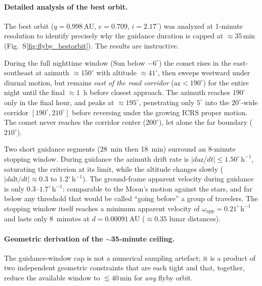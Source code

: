 \documentclass[11pt,a4paper]{article}
\begin{document}
\paragraph{Detailed analysis of the best orbit.}
The best orbit ($q=0.998$\,AU, $e=0.709$, $i=2.17^\circ$) was analyzed at
1-minute resolution to identify precisely why the guidance duration is capped
at $\approx\!35$\,min (Fig.~S\ref{fig:flyby_bestorbit}). The results are
instructive.

During the full nighttime window (Sun below $-6^\circ$) the comet rises in the
east-southeast at azimuth $\approx\!150^\circ$ with altitude $\approx\!41^\circ$,
then sweeps westward under diurnal motion, but remains \emph{east of the road
corridor} ($\mathrm{az} < 190^\circ$) for the entire night until the final
$\approx\!1$~h before closest approach. The azimuth reaches $190^\circ$ only
in the final hour, and peaks at $\approx\!195^\circ$, penetrating only
$5^\circ$ into the $20^\circ$-wide corridor $[190^\circ, 210^\circ]$ before
reversing under the growing ICRS proper motion. The comet never reaches the
corridor center ($200^\circ$), let alone the far boundary ($210^\circ$).

Two short guidance segments (28~min then 18~min) surround an 8-minute stopping
window. During guidance the azimuth drift rate is $|d\mathrm{az}/dt| \leq
1.50^\circ\,\mathrm{h}^{-1}$, saturating the criterion at its limit,
while the altitude changes slowly ($|d\mathrm{alt}/dt| \approx 0.3$ to
$1.2^\circ\,\mathrm{h}^{-1}$). The ground-frame apparent velocity during
guidance is only $0.3$--$1.7^\circ\,\mathrm{h}^{-1}$: comparable to the Moon's
motion against the stars, and far below any threshold that would be called
``going before'' a group of travelers. The stopping window itself reaches a
minimum apparent velocity of $\omega_\mathrm{app} = 0.21^\circ\,\mathrm{h}^{-1}$
and lasts only 8~minutes at $d = 0.00091$\,AU ($\approx\!0.35$ lunar distances).

\paragraph{Geometric derivation of the $\sim$35-minute ceiling.}
The guidance-window cap is not a numerical sampling artefact; it is a product of
two independent geometric constraints that are each tight and that, together,
reduce the available window to $\lesssim\!40$\,min for \emph{any} flyby orbit.
\end{document}
